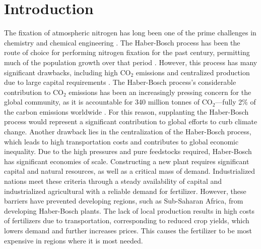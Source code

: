 \section{Introduction}
The fixation of atmospheric nitrogen has long been one of the prime challenges in chemistry and chemical engineering \cite{ritter_18, Schloegl_2003}. The Haber-Bosch process has been the route of choice for performing nitrogen fixation for the past century, permitting much of the population growth over that period \cite{Smil_1999}. However, this process has many significant drawbacks, including high CO$_2$ emissions and centralized production due to large capital requirements \cite{Comer_2019}. The Haber-Bosch process's considerable contribution to CO$_2$ emissions has been an increasingly pressing concern for the global community, as it is accountable for 340 million tonnes of CO$_2$---fully 2\% of the carbon emissions worldwide \cite{gross_12, Schiffer_2017}. For this reason, supplanting the Haber-Bosch process would represent a significant contribution to global efforts to curb climate change. Another drawback lies in the centralization of the Haber-Bosch process, which leads to high transportation costs and contributes to global economic inequality. \cite{Comer_2019} Due to the high pressures and pure feedstocks required, Haber-Bosch has significant economies of scale. Constructing a new plant requires significant capital and natural resources, as well as a critical mass of demand. Industrialized nations meet these criteria through a steady availability of capital and industrialized agricultural with a reliable demand for fertilizer. \cite{McArthur_2017} However, these barriers have prevented developing regions, such as Sub-Saharan Africa, from developing Haber-Bosch plants. The lack of local production results in high costs of fertilizers due to transportation, corresponding to reduced crop yields, which lowers demand and further increases prices. \cite{yuan_2014, IFDC_2012} This causes the fertilizer to be most expensive in regions where it is most needed.


